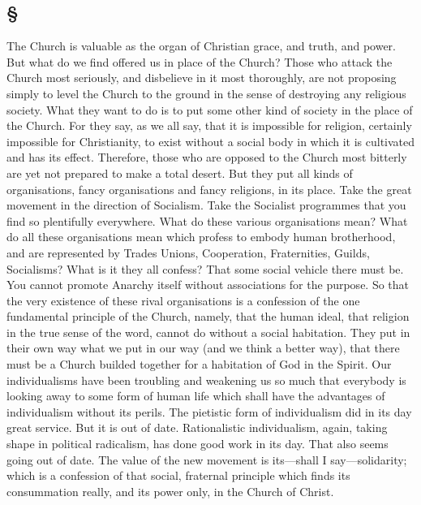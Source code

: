 \documentclass[draft]{ptfdoc}
\begin{document}
\subsection*{
\S
}

The Church is valuable as the organ of 
Christian grace, and truth, and power. But 
what do we find offered us in place of the 
Church? Those who attack the Church most 
seriously, and disbelieve in it most thoroughly, 
are not proposing simply to level the Church 
to the ground in the sense of destroying any 
religious society. What they want to do is to 
put some other kind of society in the place of 
the Church. For they say, as we all say, that it 
is impossible for religion, certainly impossible 
for Christianity, to exist without a social body 
in which it is cultivated and has its effect. 
Therefore, those who are opposed to the Church 
most bitterly are yet not prepared to make a 
total desert. But they put all kinds of organisations, 
fancy organisations and fancy religions, 
in its place. Take the great movement in the 
direction of Socialism. Take the Socialist programmes 
that you find so plentifully everywhere. 
What do these various organisations 
mean? What do all these organisations mean 
which profess to embody human brotherhood, 
and are represented by Trades Unions, Cooperation, Fraternities, Guilds, Socialisms? 
What is it they all confess? That some social 
vehicle there must be. You cannot promote 
Anarchy itself without associations for the 
purpose. So that the very existence of these 
rival organisations is a confession of the one 
fundamental principle of the Church, namely, 
that the human ideal, that religion in the 
true sense of the word, cannot do without a 
social habitation. They put in their own way 
what we put in our way (and we think a better 
way), that there must be a Church builded 
together for a habitation of God in the Spirit. 
Our individualisms have been troubling and 
weakening us so much that everybody is looking 
away to some form of human life which 
shall have the advantages of individualism 
without its perils. The pietistic form of individualism 
did in its day great service. But it is 
out of date. Rationalistic individualism, again, 
taking shape in political radicalism, has done 
good work in its day. That also seems going 
out of date. The value of the new movement 
is its---shall I say---solidarity; which is a confession 
of that social, fraternal principle which 
finds its consummation really, and its power 
only, in the Church of Christ. 
\end{document}
